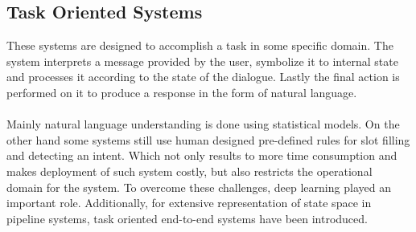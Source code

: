 \subsection{Task Oriented Systems}
These systems are designed to accomplish a task in some specific domain. The system interprets a message provided by the user, symbolize it to internal state and processes it according to the state of the dialogue. Lastly the final action is performed on it to produce a response in the form of natural language. \cite{surveyondialogsystems}
\\~\\
Mainly natural language understanding is done using statistical models. On the other hand some systems still use human designed pre-defined rules for slot filling and detecting an intent. Which not only results to more time consumption and makes deployment of such system costly, but also restricts the operational domain for the system. To overcome these challenges, deep learning played an important role. Additionally, for extensive representation of state space in pipeline systems, task oriented end-to-end systems have been introduced. \cite{surveyondialogsystems}

